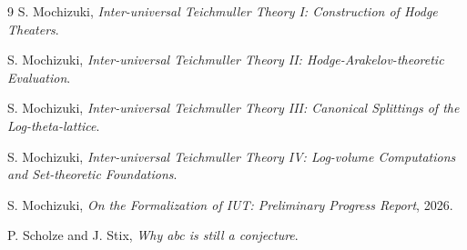 \documentclass[11pt]{article}
\theoremstyle{plain}
\theoremstyle{definition}
\theoremstyle{remark}
\begin{document}
\begingroup
\small
\begin{thebibliography}{9}
S. Mochizuki, \emph{Inter-universal Teichmuller Theory I:
Construction of Hodge Theaters}.

S. Mochizuki, \emph{Inter-universal Teichmuller Theory II:
Hodge-Arakelov-theoretic Evaluation}.

S. Mochizuki, \emph{Inter-universal Teichmuller Theory III:
Canonical Splittings of the Log-theta-lattice}.

S. Mochizuki, \emph{Inter-universal Teichmuller Theory IV:
Log-volume Computations and Set-theoretic Foundations}.

S. Mochizuki, \emph{On the Formalization of IUT: Preliminary Progress Report},
2026.

P. Scholze and J. Stix, \emph{Why abc is still a conjecture}.
\end{thebibliography}
\endgroup
\end{document}
